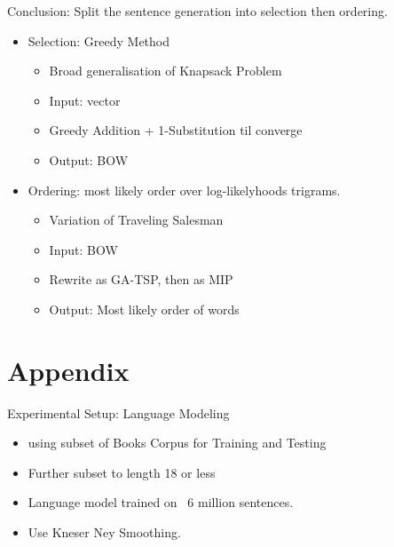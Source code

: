 \documentclass[]{beamer}
\newcommand{\s}{\tilde{s}}
\newcommand{\x}{\tilde{x}}
\newcommand{\V}{\mathcal{V}}
\newcommand{\B}{\mathcal{B}}
\renewcommand{\s}{w_{\blacktriangleright}}
\begin{document}
\begin{frame}{Conclusion: Split the sentence generation into selection then ordering.}
	\begin{itemize}
		\item<1->Selection: Greedy Method
		\begin{itemize}
			\item Broad generalisation of Knapsack Problem
			\item Input: vector
			\item Greedy Addition + 1-Substitution til converge
			\item Output: BOW
		\end{itemize}
		\vfill
		\item<2->Ordering: most likely order over log-likelyhoods trigrams.
		\begin{itemize}
			\item Variation of Traveling Salesman
			\item Input: BOW
			\item Rewrite as GA-TSP, then as MIP
			\item Output: Most likely order of words
		\end{itemize}
	\end{itemize}
\end{frame}

\section{Appendix}

\begin{frame}{Experimental Setup: Language Modeling}
	\begin{itemize}
		\item using subset of Books Corpus for Training and Testing
		\item<1-> Further subset to length 18 or less
		\vfill
		\item<2-> Language model trained on ~6 million sentences.
		\item<2-> Use Kneser Ney Smoothing. 
		
	\end{itemize}
\end{frame}



\newcommand{\vectorselectionproblemdefnalt}{Find the bag of vectors $\B$ (a multi-subset of $\V$), such that $\displaystyle \Sigma(\B)=\sum_{\x_a\in\B}\x_a$ we have  $\min d(\s,\Sigma(\B))$}
\end{document}
